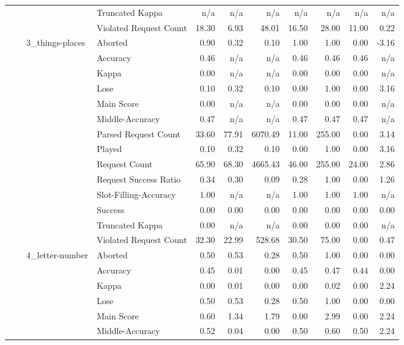 \begin{tabular}{llllrrrrrrr}
 &  &  & Truncated Kappa & n/a & n/a & n/a & n/a & n/a & n/a & n/a \\
 &  &  & Violated Request Count & 18.30 & 6.93 & 48.01 & 16.50 & 28.00 & 11.00 & 0.22 \\
\cline{3-11}
 &  & \multirow[t]{14}{*}{3_things-places} & Aborted & 0.90 & 0.32 & 0.10 & 1.00 & 1.00 & 0.00 & -3.16 \\
 &  &  & Accuracy & 0.46 & n/a & n/a & 0.46 & 0.46 & 0.46 & n/a \\
 &  &  & Kappa & 0.00 & n/a & n/a & 0.00 & 0.00 & 0.00 & n/a \\
 &  &  & Lose & 0.10 & 0.32 & 0.10 & 0.00 & 1.00 & 0.00 & 3.16 \\
 &  &  & Main Score & 0.00 & n/a & n/a & 0.00 & 0.00 & 0.00 & n/a \\
 &  &  & Middle-Accuracy & 0.47 & n/a & n/a & 0.47 & 0.47 & 0.47 & n/a \\
 &  &  & Parsed Request Count & 33.60 & 77.91 & 6070.49 & 11.00 & 255.00 & 0.00 & 3.14 \\
 &  &  & Played & 0.10 & 0.32 & 0.10 & 0.00 & 1.00 & 0.00 & 3.16 \\
 &  &  & Request Count & 65.90 & 68.30 & 4665.43 & 46.00 & 255.00 & 24.00 & 2.86 \\
 &  &  & Request Success Ratio & 0.34 & 0.30 & 0.09 & 0.28 & 1.00 & 0.00 & 1.26 \\
 &  &  & Slot-Filling-Accuracy & 1.00 & n/a & n/a & 1.00 & 1.00 & 1.00 & n/a \\
 &  &  & Success & 0.00 & 0.00 & 0.00 & 0.00 & 0.00 & 0.00 & 0.00 \\
 &  &  & Truncated Kappa & 0.00 & n/a & n/a & 0.00 & 0.00 & 0.00 & n/a \\
 &  &  & Violated Request Count & 32.30 & 22.99 & 528.68 & 30.50 & 75.00 & 0.00 & 0.47 \\
\cline{3-11}
 &  & \multirow[t]{14}{*}{4_letter-number} & Aborted & 0.50 & 0.53 & 0.28 & 0.50 & 1.00 & 0.00 & 0.00 \\
 &  &  & Accuracy & 0.45 & 0.01 & 0.00 & 0.45 & 0.47 & 0.44 & 0.00 \\
 &  &  & Kappa & 0.00 & 0.01 & 0.00 & 0.00 & 0.02 & 0.00 & 2.24 \\
 &  &  & Lose & 0.50 & 0.53 & 0.28 & 0.50 & 1.00 & 0.00 & 0.00 \\
 &  &  & Main Score & 0.60 & 1.34 & 1.79 & 0.00 & 2.99 & 0.00 & 2.24 \\
 &  &  & Middle-Accuracy & 0.52 & 0.04 & 0.00 & 0.50 & 0.60 & 0.50 & 2.24 \\

\end{tabular}
